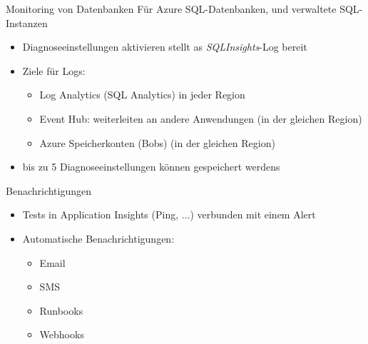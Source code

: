\begin{flashcard}[]{Monitoring von Datenbanken}
  Für Azure SQL-Datenbanken, und verwaltete SQL-Instanzen
  \begin{itemize}
    \item Diagnoseeinstellungen aktivieren stellt as \emph{SQLInsights}-Log bereit
    \item Ziele für Logs:
      \begin{itemize}
        \item Log Analytics (SQL Analytics) in jeder Region
        \item Event Hub: weiterleiten an andere Anwendungen (in der gleichen Region)
        \item Azure Speicherkonten (Bobs) (in der gleichen Region)
      \end{itemize}
    \item bis zu 5 Diagnoseeinstellungen können gespeichert werdens
  \end{itemize}
\end{flashcard}


\begin{flashcard}[Definition]{Benachrichtigungen}
  \begin{itemize}
    \item Tests in Application Insights (Ping, $\ldots$) verbunden mit einem Alert
    \item Automatische Benachrichtigungen:
    \begin{itemize}
      \item Email
      \item SMS
      \item Runbooks
      \item Webhooks
    \end{itemize}

  \end{itemize}
\end{flashcard}


